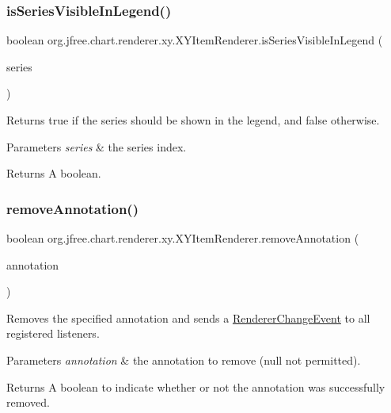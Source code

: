 \subsubsection{\texorpdfstring{is\+Series\+Visible\+In\+Legend()}{isSeriesVisibleInLegend()}}
{\footnotesize\ttfamily boolean org.\+jfree.\+chart.\+renderer.\+xy.\+X\+Y\+Item\+Renderer.\+is\+Series\+Visible\+In\+Legend (\begin{DoxyParamCaption}\item[{int}]{series }\end{DoxyParamCaption})}

Returns {\ttfamily true} if the series should be shown in the legend, and {\ttfamily false} otherwise.


\begin{DoxyParams}{Parameters}
{\em series} & the series index.\\
\hline
\end{DoxyParams}
\begin{DoxyReturn}{Returns}
A boolean. 
\end{DoxyReturn}
\mbox{\label{interfaceorg_1_1jfree_1_1chart_1_1renderer_1_1xy_1_1_x_y_item_renderer_ac6ef484d5287771573064a5a76673d92}} 
\subsubsection{\texorpdfstring{remove\+Annotation()}{removeAnnotation()}}
{\footnotesize\ttfamily boolean org.\+jfree.\+chart.\+renderer.\+xy.\+X\+Y\+Item\+Renderer.\+remove\+Annotation (\begin{DoxyParamCaption}\item[{\mbox{\hyperlink{interfaceorg_1_1jfree_1_1chart_1_1annotations_1_1_x_y_annotation}{X\+Y\+Annotation}}}]{annotation }\end{DoxyParamCaption})}

Removes the specified annotation and sends a \mbox{\hyperlink{}{Renderer\+Change\+Event}} to all registered listeners.


\begin{DoxyParams}{Parameters}
{\em annotation} & the annotation to remove ({\ttfamily null} not permitted).\\
\hline
\end{DoxyParams}
\begin{DoxyReturn}{Returns}
A boolean to indicate whether or not the annotation was successfully removed. 
\end{DoxyReturn}


